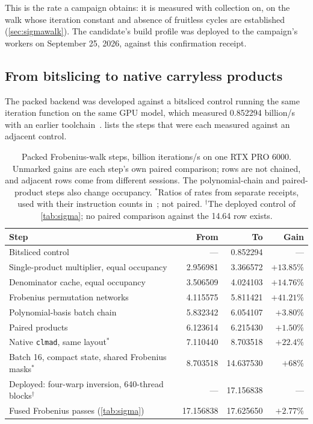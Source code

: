 \documentclass[11pt,a4paper]{article}
\newcommand{\code}[1]{\texttt{\small #1}}
\begin{document}
This is the rate a campaign obtains: it is measured with collection on, on the walk whose iteration constant and absence of fruitless cycles are established (\cref{sec:sigmawalk}). The candidate's build profile was deployed to the campaign's workers on September 25, 2026, against this confirmation receipt.

\subsection{From bitslicing to native carryless products}\label{sec:ladder}
The packed backend was developed against a bitsliced control running the same iteration function on the same GPU model, which measured 0.852294 billion/s with an earlier toolchain~\cite{packedledger}.  lists the steps that were each measured against an adjacent control.

\begin{table}[t]
\centering\small
\begin{tabularx}{\linewidth}{@{}Yrrr@{}}
\toprule
Step & From & To & Gain\\
\midrule
Bitsliced control & --- & 0.852294 & ---\\
Single-product multiplier, equal occupancy & 2.956981 & 3.366572 & $+13.85\%$\\
Denominator cache, equal occupancy & 3.506509 & 4.024103 & $+14.76\%$\\
Frobenius permutation networks & 4.115575 & 5.811421 & $+41.21\%$\\
Polynomial-basis batch chain & 5.832342 & 6.054107 & $+3.80\%$\\
Paired products & 6.123614 & 6.215430 & $+1.50\%$\\
Native \code{clmad}, same layout$^{*}$ & 7.110440 & 8.703518 & $+22.4\%$\\
Batch 16, compact state, shared Frobenius masks$^{*}$ & 8.703518 & 14.637530 & $+68\%$\\
Deployed: four-warp inversion, 640-thread blocks$^{\dagger}$ & --- & 17.156838 & ---\\
Fused Frobenius passes (\cref{tab:sigma}) & 17.156838 & 17.625650 & $+2.77\%$\\
\bottomrule
\end{tabularx}
\caption{Packed Frobenius-walk steps, billion iterations/s on one RTX PRO 6000. Unmarked gains are each step's own paired comparison; rows are not chained, and adjacent rows come from different sessions. The polynomial-chain and paired-product steps also change occupancy. $^{*}$Ratios of rates from separate receipts, used with their instruction counts in~\cite{throughput30}; not paired. $^{\dagger}$The deployed control of \cref{tab:sigma}; no paired comparison against the 14.64 row exists.}
\label{tab:ladder-sigma}
\end{table}
\end{document}
